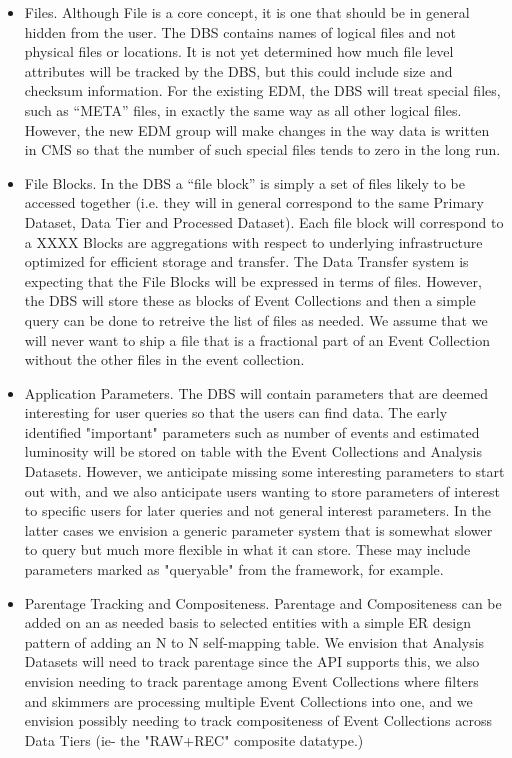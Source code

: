 \documentclass{cmspaper}
\begin{document}
\begin{itemize}
\item Files.  Although File is a core concept, it is one that should be 
in general hidden from the user. The DBS contains names of logical files and 
not physical files or locations.  It is not yet determined how much file 
level attributes will be tracked by the DBS, but this could include size and 
checksum information.
For the existing EDM, the DBS will treat special files, such as ``META'' 
files, in exactly the same way as all other logical files. However, the new
EDM group will make changes in the way data is written in CMS so that the 
number of such special files tends to zero in the long run.  

\item File Blocks.  In the DBS a ``file block'' is simply a set of files
likely to be accessed together (i.e. they will in general correspond to
the same Primary Dataset, Data Tier and Processed Dataset). Each file 
block will correspond to a XXXX
Blocks are aggregations with respect to underlying 
infrastructure optimized for efficient storage and transfer.  The Data
Transfer system is expecting that the File Blocks will be expressed in terms
of files. However, the DBS will store these as blocks of Event Collections 
and then a simple query can be done to retreive the list of files as needed. 
We assume that we will never want to ship a file that is a fractional part of 
an Event Collection without the other files in the event collection. 

\item Application Parameters. The DBS will contain parameters that are deemed 
interesting for user queries so that the users can find data. The early 
identified "important" parameters such as number of events and estimated 
luminosity will be stored on table with the Event Collections and Analysis 
Datasets.  However, we anticipate missing some interesting parameters to 
start out with, and we also anticipate users wanting to store parameters 
of interest to specific users for later queries and not general interest 
parameters.  In the latter cases we envision a generic parameter system that 
is somewhat slower to query but much more flexible in what it can store. 
These may include parameters marked as "queryable" from the framework, for 
example.  

\item Parentage Tracking and Compositeness. Parentage and Compositeness can 
be added on an as needed basis to selected entities with a simple ER 
design pattern of adding an N to N self-mapping table.  We envision that 
Analysis Datasets will need to track parentage since the API supports this, 
we also envision needing to track parentage among Event Collections where 
filters and skimmers are processing multiple Event Collections into one, and 
we envision possibly needing to track compositeness of Event Collections 
across Data Tiers (ie- the "RAW+REC" composite datatype.)   

\end{itemize}
\end{document}
